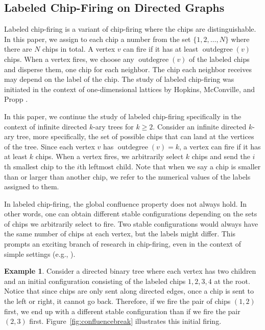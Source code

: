 \documentclass[11pt]{article}
\theoremstyle{definition}
\newtheorem{example}{Example}
\theoremstyle{remark}
\DeclareMathOperator{\outdeg}{outdegree}
\begin{document}
\subsection{Labeled Chip-Firing on Directed Graphs}
\label{labeledchipfirng}

Labeled chip-firing is a variant of chip-firing where the chips are distinguishable. In this paper, we assign to each chip a number from the set $\{1,2,\dots, N\}$ where there are $N$ chips in total. A vertex $v$ can fire if it has at least $\outdeg(v)$ chips. When a vertex fires, we choose any $\outdeg(v)$ of the labeled chips and disperse them, one chip for each neighbor. The chip each neighbor receives may depend on the label of the chip. The study of labeled chip-firing was initiated in the context of one-dimensional lattices by Hopkins, McConville, and Propp \cite{MR3691530}.

In this paper, we continue the study of labeled chip-firing specifically in the context of infinite directed $k$-ary trees for $k \geq 2$. Consider an infinite directed $k$-ary tree, more specifically, the set of possible chips that can land at the vertices of the tree. Since each vertex $v$ has $\outdeg(v) = k$, a vertex can fire if it has at least $k$ chips. When a vertex fires, we arbitrarily select $k$ chips and send the $i$th smallest chip to the $i$th leftmost child. Note that when we say a chip is smaller than or larger than another chip, we refer to the numerical values of the labels assigned to them. 

In labeled chip-firing, the global confluence property does not always hold. In other words, one can obtain different stable configurations depending on the sets of chips we arbitrarily select to fire. Two stable configurations would always have the same number of chips at each vertex, but the labels might differ. This prompts an exciting branch of research in chip-firing, even in the context of simple settings (e.g., \cite{MR4333108, MR4827886}).
 
\begin{example}
Consider a directed binary tree where each vertex has two children and an initial configuration consisting of the labeled chips $1,2,3,4$ at the root. Notice that since chips are only sent along directed edges, once a chip is sent to the left or right, it cannot go back. Therefore, if we fire the pair of chips $(1,2)$ first, we end up with a different stable configuration than if we fire the pair $(2,3)$ first. Figure~\ref{fig:confluencebreak} illustrates this initial firing. 
\end{example}
\end{document}
